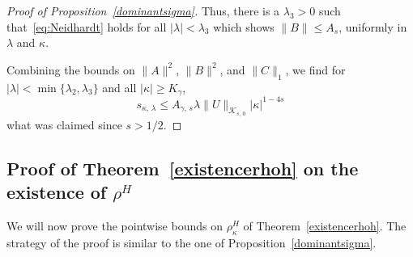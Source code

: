 \documentclass[AHL,Unicode,longabstracts,published]{cedram}
\newcommand*\cK{\mathcal{K}}
\begin{document}
\begin{proof}[Proof of Proposition~\ref{dominantsigma}]
Thus, there is a $\lambda_3>0$ such that~\eqref{eq:Neidhardt} holds for all $|\lambda|<\lambda_3$ which shows $\|B\|\leq A_{s}$, uniformly in $\lambda$ and $\kappa$.

Combining the bounds on $\|A\|^2$, $\|B\|^2$, and $\|C\|_1$, we find for $|\lambda|<\min\{\lambda_2,\lambda_3\}$ and all $|\kappa|\geq K_\gamma$,
\[
s_{\kappa,\,\lambda}
\leq A_{\gamma,\,s}\lambda \|U\|_{\cK_{s,\,0}} |\kappa|^{1-4s}
\]
what was claimed since $s>1/2$.
\end{proof}



\subsection{Proof of Theorem~\ref{existencerhoh} on the existence of \texorpdfstring{$\rho^H$}{rhoH}}
We will now prove the pointwise bounds on $\rho_{\kappa}^H$ of Theorem~\ref{existencerhoh}. The strategy of the proof is similar to the one of Proposition~\ref{dominantsigma}.
\end{document}
